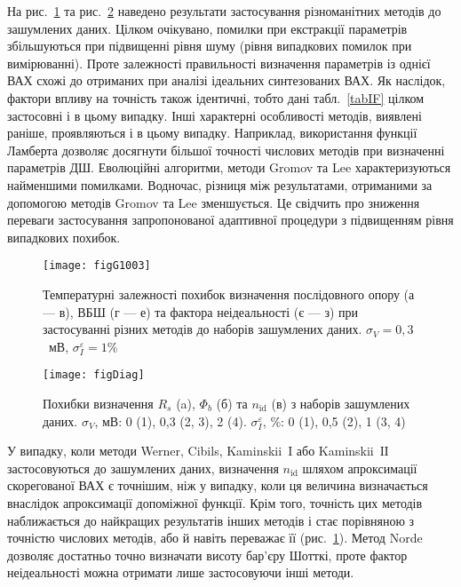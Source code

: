 На рис.~\ref{figG1003} та рис.~\ref{figDiag} наведено результати застосування різноманітних методів до зашумлених даних.
Цілком очікувано, помилки при екстракції параметрів збільшуються при підвищенні рівня шуму (рівня випадкових помилок при вимірюванні).
Проте залежності правильності визначення параметрів із однієї ВАХ схожі до отриманих при аналізі ідеальних синтезованих ВАХ.
Як наслідок, фактори впливу на точність також ідентичні, тобто дані табл.~\ref{tabIF} цілком застосовні і в цьому випадку.
Інші характерні особливості методів, виявлені раніше, проявляються і в цьому випадку.
Наприклад, використання функції Ламберта дозволяє досягнути більшої точності числових методів при визначенні параметрів ДШ.
Еволюційні алгоритми, методи Gromov та Lee характеризуються найменшими помилками.
Водночас, різниця між результатами, отриманими за допомогою методів Gromov та Lee зменшується.
Це свідчить про зниження переваги застосування запропонованої адаптивної процедури з підвищенням рівня випадкових похибок.



\begin{figure}
\center
\texttt{[image: figG1003]}%
\caption{\label{figG1003}
Температурні залежності похибок визначення послідовного опору (а --- в), ВБШ (г --- е) та фактора неідеальності (є --- з) при застосуванні різних методів до наборів зашумлених даних.
$\sigma_V=0,3$~мВ, $\sigma_I^\varepsilon=1\%$
}
\end{figure}

\begin{figure}
\center
\texttt{[image: figDiag]}%
\caption{\label{figDiag}
Похибки визначення $R_s$ (a), $\Phi_b$ (б) та $n_\mathrm{id}$ (в) з наборів зашумлених даних.
$\sigma_V$, мВ: 0 (1), 0,3 (2, 3), 2 (4).
$\sigma_I^\varepsilon$, \%: 0 (1), 0,5 (2), 1 (3, 4)
}
\end{figure}


У випадку, коли методи Werner, Cibils, Kaminskii~I або  Kaminskii~IІ застосовуються до зашумлених даних, визначення $n_\mathrm{id}$ шляхом апроксимації скорегованої ВАХ є точнішим, ніж у випадку, коли ця величина визначається внаслідок апроксимації допоміжної функції.
Крім того, точність цих методів наближається до найкращих результатів інших методів і стає порівняною з точністю числових методів, або й навіть переважає її (рис.~\ref{figG1003}).
Метод Norde дозволяє достатньо точно визначати висоту бар'єру Шотткі, проте фактор неідеальності можна отримати лише застосовуючи інші методи.

